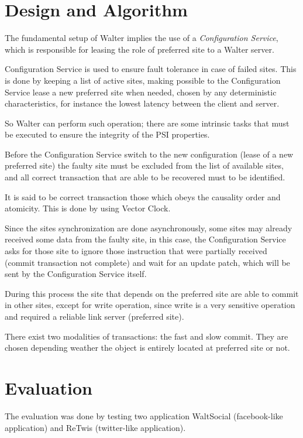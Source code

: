 \documentclass[a4paper]{article}
\begin{document}
\section{Design and Algorithm}

The fundamental setup of Walter implies the use of a \textit{Configuration Service}, which is responsible for leasing the role of preferred site to a Walter server. 

Configuration Service is used to ensure fault tolerance in case of failed sites. This is done by keeping a list of active sites, making possible to the Configuration Service lease a new preferred site when needed, chosen by any deterministic characteristics, for instance the lowest latency between the client and server. 

So Walter can perform such operation; there are some intrinsic tasks that must be executed to ensure the integrity of the PSI properties.

Before the Configuration Service switch to the new configuration (lease of a new preferred site) the faulty site must be excluded from the list of available sites, and all correct transaction that are able to be recovered must to be identified.

It is said to be correct transaction those which obeys the causality order and atomicity. This is done by using Vector Clock. 

Since the sites synchronization are done asynchronously, some sites may already received some data from the faulty site, in this case, the Configuration Service asks for those site to ignore those instruction that were partially received (commit transaction not complete) and wait for an update patch, which will be sent by the Configuration Service itself.

During this process the site that depends on the preferred site are able to commit in other sites, except for write operation, since write is a very sensitive operation and required a reliable link server (preferred site).

There exist two modalities of transactions: the fast and slow commit. They are chosen depending weather the object is entirely located at preferred site  or not.


\section{Evaluation}

The evaluation was done by testing two application WaltSocial (facebook-like application) and ReTwis (twitter-like application).
\end{document}
